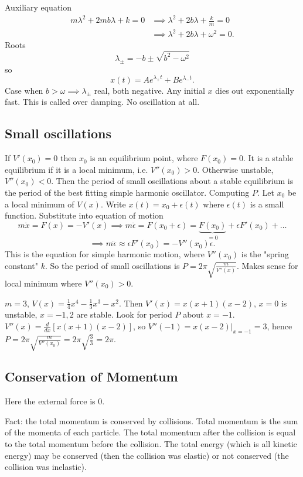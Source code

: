 \documentclass[10pt, a4paper]{article}
\begin{document}
Auxiliary equation
\begin{align*}
    m\lambda ^2 + 2mb\lambda + k = 0 &\implies \lambda ^ 2 + 2b\lambda + \frac{k}{m} = 0 \\
    &\implies \lambda ^ 2 + 2b\lambda + \omega ^ 2 = 0.
\end{align*}
Roots
\[
\lambda_{\pm} = -b \pm \sqrt{b ^ 2 - \omega ^ 2}
\]
so
\[
x(t) = Ae ^ {\lambda_{+}t} + Be ^ {\lambda_{-}t}.
\]
Case when $b > \omega \implies \lambda_{\pm}$ real,
both negative.
Any initial $x$ dies out exponentially fast.
This is called over damping.
No oscillation at all.

\subsection{Small oscillations}
If $V'(x_0) = 0$ then $x_0$ is an equilibrium point,
where $F(x_0) = 0$.
It is a stable equilibrium if it is a local minimum,
i.e. $V''(x_0) > 0$.
Otherwise unstable,
$V''(x_0) < 0$.
Then the period of small oscillations about a stable equilibrium is the period of the best fitting simple harmonic oscillator.
Computing $P$.
Let $x_0$ be a local minimum of $V(x)$.
Write $x(t) = x_0 + \epsilon(t)$ where $\epsilon(t)$ is a small function.
Substitute into equation of motion
\[
m\ddot{x} = F(x) = -V'(x) \implies m\ddot{\epsilon} = F(x_0 + \epsilon) = \underbrace{F(x_0)}_{=0} + \epsilon F'(x_0) + \dotsc
\]
\[
\implies m\ddot{\epsilon} \approx \epsilon F'(x_0) = -V''(x_0)\epsilon.
\]
This is the equation for simple harmonic motion,
where $V''(x_0)$ is the "spring constant" $k$.
So the period of small oscillations is $P = 2\pi\sqrt{\frac{m}{V''(x)}}$.
Makes sense for local minimum where $V''(x_0) > 0$.

\begin{example}
    $m = 3$,
    $V(x) = \frac{1}{4}x ^ 4 - \frac{1}{3}x ^ 3 - x ^ 2$.
    Then $V'(x) = x(x + 1)(x - 2)$,
    $x = 0$ is unstable,
    $x = -1, 2$ are stable.
    Look for period $P$ about $x = -1$.
    $V''(x) = \frac{d}{dx}\left[x(x + 1)(x - 2)\right]$,
    so $V''(-1) = \left. x(x - 2)\right|_{x = -1} = 3$,
    hence $P = 2\pi\sqrt{\frac{m}{V''(x_0)}} = 2\pi\sqrt{\frac{3}{3}} = 2\pi$.
\end{example}

\subsection{Conservation of Momentum}
Here the external force is $0$.

Fact:
the total momentum is conserved by collisions.
Total momentum is the sum of the momenta of each particle.
The total momentum after the collision is equal to the total momentum before the collision.
The total energy
(which is all kinetic energy)
may be conserved
(then the collision was elastic)
or not conserved
(the collision was inelastic).
\end{document}
